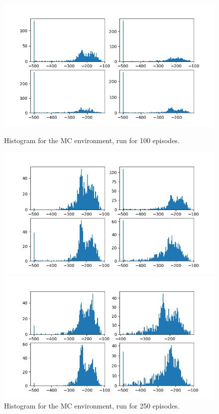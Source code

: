\documentclass[hidelinks,journal]{IEEEtran}
\begin{document}
\begin{figure}[p]
  \centering
  \includegraphics[scale=0.45]{graph/mc1ResHist.png}
  \caption{Histogram for the MC environment, run for 100 episodes.}
  \label{fig:mc1ResHist}
  \includegraphics[scale=0.45]{graph/mc2ResHist.png}
  \caption{Histogram for the MC environment, run for 250 episodes.}
  \label{fig:mc2ResHist}
  \includegraphics[scale=0.45]{graph/mc3ResHist.png}

\end{figure}
\end{document}
